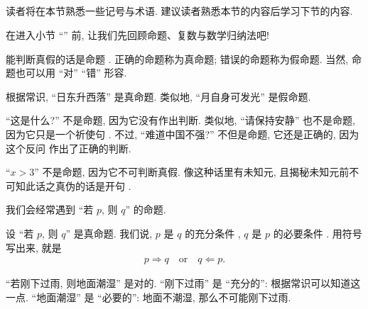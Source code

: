 \subsection*{\Prerequisites}
\markright{\Prerequisites}

读者将在本节熟悉一些记号与术语. 建议读者熟悉本节的内容后学习下节的内容.

在进入小节 ``\Sets '' 前, 让我们先回顾命题、复数与数学归纳法吧!

\begin{definition}
    能判断真假的话是命题 . 正确的命题称为真命题; 错误的命题称为假命题. 当然, 命题也可以用 ``对'' ``错'' 形容.
\end{definition}

\begin{example}
    根据常识, ``日东升西落'' 是真命题. 类似地, ``月自身可发光'' 是假命题.

    ``这是什么?'' 不是命题, 因为它没有作出判断. 类似地, ``请保持安静'' 也不是命题, 因为它只是一个祈使句 . 不过, ``难道中国不强?'' 不但是命题, 它还是正确的, 因为这个反问  作出了正确的判断.

    ``$x > 3$'' 不是命题, 因为它不可判断真假. 像这种话里有未知元, 且揭秘未知元前不可知此话之真伪的话是开句 .
\end{example}

我们会经常遇到 ``若 $p$, 则 $q$'' 的命题.

\begin{definition}
    设 ``若 $p$, 则 $q$'' 是真命题. 我们说, $p$ 是 $q$ 的充分条件 , $q$ 是 $p$ 的必要条件 . 用符号写出来, 就是
    \begin{align*}
        p \Rightarrow q \quad \text{or} \quad q \Leftarrow p.
    \end{align*}
\end{definition}

\begin{example}
    ``若刚下过雨, 则地面潮湿'' 是对的. ``刚下过雨'' 是 ``充分的'': 根据常识可以知道这一点. ``地面潮湿'' 是 ``必要的'': 地面不潮湿, 那么不可能刚下过雨.
\end{example}

